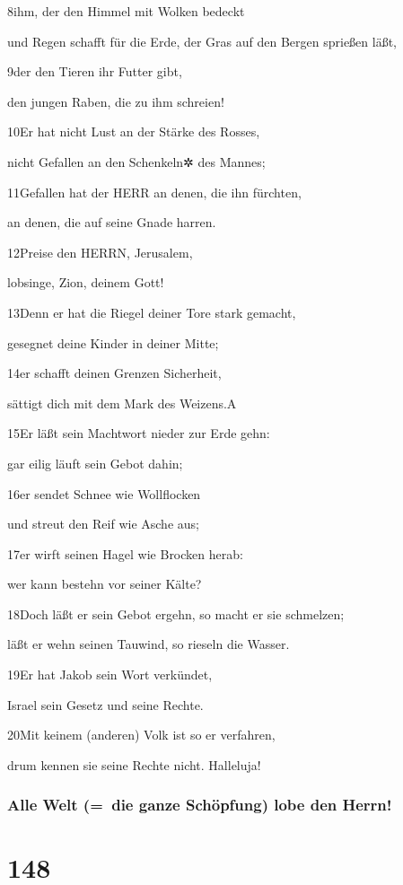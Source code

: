 8ihm, der den Himmel mit Wolken bedeckt

und Regen schafft für die Erde, der Gras auf den Bergen sprießen läßt,

9der den Tieren ihr Futter gibt,

den jungen Raben, die zu ihm schreien!

10Er hat nicht Lust an der Stärke des Rosses,

nicht Gefallen an den Schenkeln✲ des Mannes;

11Gefallen hat der HERR an denen, die ihn fürchten,

an denen, die auf seine Gnade harren.

12Preise den HERRN, Jerusalem,

lobsinge, Zion, deinem Gott!

13Denn er hat die Riegel deiner Tore stark gemacht,

gesegnet deine Kinder in deiner Mitte;

14er schafft deinen Grenzen Sicherheit,

sättigt dich mit dem Mark des Weizens.{A}

15Er läßt sein Machtwort nieder zur Erde gehn:

gar eilig läuft sein Gebot dahin;

16er sendet Schnee wie Wollflocken

und streut den Reif wie Asche aus;

17er wirft seinen Hagel wie Brocken herab:

wer kann bestehn vor seiner Kälte?

18Doch läßt er sein Gebot ergehn, so macht er sie schmelzen;

läßt er wehn seinen Tauwind, so rieseln die Wasser.

19Er hat Jakob sein Wort verkündet,

Israel sein Gesetz und seine Rechte.

20Mit keinem (anderen) Volk ist so er verfahren,

drum kennen sie seine Rechte nicht. Halleluja!

\hypertarget{alle-welt-die-ganze-schuxf6pfung-lobe-den-herrn}{%
\subsubsection{Alle Welt (=~die ganze Schöpfung) lobe den
Herrn!}\label{alle-welt-die-ganze-schuxf6pfung-lobe-den-herrn}}

\hypertarget{section-147}{%
\section{148}\label{section-147}}

